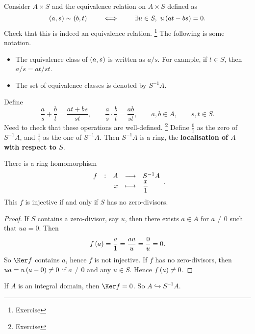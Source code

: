 \begin{definition}
Consider $ A \times S $ and the equivalence relation on $ A \times S $ defined as
$$ \br{a, s} \sim \br{b, t} \qquad \iff \qquad \exists u \in S, \ u\br{at - bs} = 0. $$
Check that this is indeed an equivalence relation. \footnote{Exercise} The following is some notation.
\begin{itemize}
\item The equivalence class of $ \br{a, s} $ is written as $ a / s $. For example, if $ t \in S $, then $ a / s = at / st $.
\item The set of equivalence classes is denoted by $ S^{-1}A $.
\end{itemize}
Define
$$ \dfrac{a}{s} + \dfrac{b}{t} = \dfrac{at + bs}{st}, \qquad \dfrac{a}{s} \cdot \dfrac{b}{t} = \dfrac{ab}{st}, \qquad a, b \in A, \qquad s, t \in S. $$
Need to check that these operations are well-defined. \footnote{Exercise} Define $ \tfrac{0}{1} $ as the zero of $ S^{-1}A $, and $ \tfrac{1}{1} $ as the one of $ S^{-1}A $. Then $ S^{-1}A $ is a ring, the \textbf{localisation of $ A $ with respect to $ S $}.
\end{definition}

\begin{lemma}
There is a ring homomorphism
$$ \function[f]{A}{S^{-1}A}{x}{\dfrac{x}{1}}. $$
This $ f $ is injective if and only if $ S $ has no zero-divisors.
\end{lemma}

\begin{proof}
If $ S $ contains a zero-divisor, say $ u $, then there exists $ a \in A $ for $ a \ne 0 $ such that $ ua = 0 $. Then
$$ f\br{a} = \dfrac{a}{1} = \dfrac{au}{u} = \dfrac{0}{u} = 0. $$
So $ \Ker f $ contains $ a $, hence $ f $ is not injective. If $ f $ has no zero-divisors, then $ ua = u\br{a - 0} \ne 0 $ if $ a \ne 0 $ and any $ u \in S $. Hence $ f\br{a} \ne 0 $.
\end{proof}


If $ A $ is an integral domain, then $ \Ker f = 0 $. So $ A \hookrightarrow S^{-1}A $.

\pagebreak

